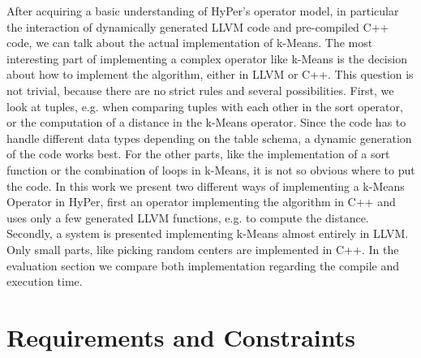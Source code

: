 After acquiring a basic understanding of HyPer’s operator model, in particular the interaction of dynamically generated LLVM code and pre-compiled C++ code, we can talk about the actual implementation of k-Means. The most interesting part of implementing a complex operator like k-Means is the decision about how to implement the algorithm, either in LLVM or C++. 
This question is not trivial, because there are no strict rules and several possibilities. First, we look at tuples, e.g. when comparing tuples with each other in the sort operator, or the computation of a distance in the k-Means operator. Since the code has to handle different data types depending on the table schema, a dynamic generation of the code works best. For the other parts, like the implementation of a sort function or the combination of loops in k-Means, it is not so obvious where to put the code. In this work we present two different ways of implementing a k-Means Operator in HyPer, first an operator implementing the algorithm in C++ and uses only a few generated LLVM functions, e.g. to compute the distance. Secondly, a system is presented implementing k-Means almost entirely in LLVM. Only small parts, like picking random centers are implemented in C++. In the evaluation section we compare both implementation regarding the compile and execution time.


\section{Requirements and Constraints}

